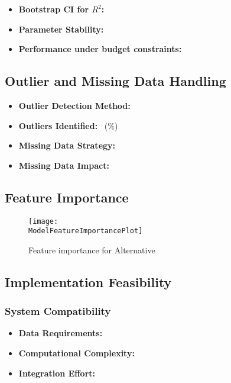 \begin{itemize}
    \item \textbf{Bootstrap CI for $R^2$:} 
    \item \textbf{Parameter Stability:} \ModelParameterStability
    \item \textbf{Performance under budget constraints:} \ModelBudgetConstraintPerformance
\end{itemize}

\subsection{Outlier and Missing Data Handling}

\begin{itemize}
    \item \textbf{Outlier Detection Method:} \ModelOutlierMethod
    \item \textbf{Outliers Identified:} \ModelOutlierCount\ (\ModelOutlierPercentage\%)
    \item \textbf{Missing Data Strategy:} \ModelMissingDataStrategy
    \item \textbf{Missing Data Impact:} \ModelMissingDataImpact
\end{itemize}

\subsection{Feature Importance}

\begin{figure}[h]
    \centering
    \texttt{[image: \\ModelFeatureImportancePlot]}
    \caption{Feature importance for Alternative \ModelAlternativeNumber}
    \label{fig:feat_\ModelAlternativeNumber}
\end{figure}

\subsection{Implementation Feasibility}

\subsubsection{System Compatibility}
\begin{itemize}
    \item \textbf{Data Requirements:} \ModelDataRequirements
    \item \textbf{Computational Complexity:} \ModelComputationalComplexity
    \item \textbf{Integration Effort:} \ModelIntegrationEffort
\end{itemize}

